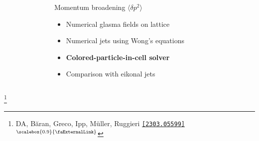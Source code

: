 \documentclass[aspectratio=169,11pt,usenames,dvipsnames]{beamer}
\renewcommand{\thefootnote}{\color{customblue}\faPaperPlaneO}
\newcommand\blfootnote[1]{%
  \begingroup
  \renewcommand\thefootnote{}\footnote{#1}%
  \addtocounter{footnote}{-1}%
  \endgroup
}
\begin{document}
\begin{frame}[t,noframenumbering]
\begin{columns}[onlytextwidth,t]
\begin{figure}
        \end{figure}
        \begin{center}
            {\Large\color{isgold} Momentum broadening $\langle \delta p^2\rangle$\\[10pt]}
            \footnotesize
                \begin{itemize}
                    \item {\color{lightgray}Numerical glasma fields on lattice}
                    \item {\color{lightgray}Numerical jets using Wong's equations}
                    \item {\color{lightgray}\bfseries Colored-particle-in-cell solver}
                    \item {\color{lightgray}Comparison with eikonal jets}
                \end{itemize}
        \end{center}
    \end{columns}
    \blfootnote{\scriptsize DA, Băran, Greco, Ipp, Müller, Ruggieri \href{https://arxiv.org/abs/2303.05599}{\color{palgold}\texttt{[2303.05599]}$^\text{\scalebox{0.9}{\faExternalLink}}$}}
\end{frame}

\end{document}
